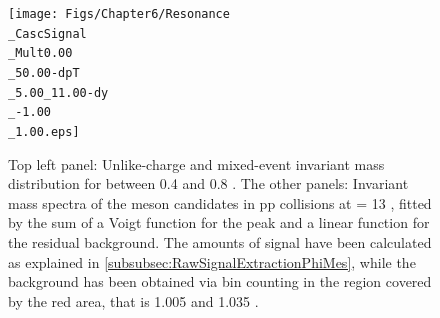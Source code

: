 {\begin{landscape}
\begin{figure}[p]
\begin{minipage}[t]{.3\textwidth}
    \end{minipage}
    \hfill
    \begin{minipage}[t]{.3\textwidth}
		\hspace*{-4.cm}
        \texttt{[image: Figs/Chapter6/Resonance\\\_CascSignal\\\_Mult0.00\\\_50.00-dpT\\\_5.00\_11.00-dy\\\_-1.00\\\_1.00.eps]}
    \end{minipage}  
\caption{Top left panel: Unlike-charge and mixed-event invariant mass distribution for \pT between 0.4 and 0.8 \gmom. The other panels: Invariant mass spectra of the \rmPhiMes meson candidates in pp collisions at \sqrtS = 13 \tev, fitted by the sum of a Voigt function for the peak and a linear function for the residual background. The amounts of signal have been calculated as explained in \Sec\ref{subsubsec:RawSignalExtractionPhiMes}, while the background has been obtained via bin counting in the region covered by the red area, that is 1.005 and 1.035 \gmass.}
	\label{fig:InvMassPhiResVsPt}
\end{figure}
\end{landscape}
}

